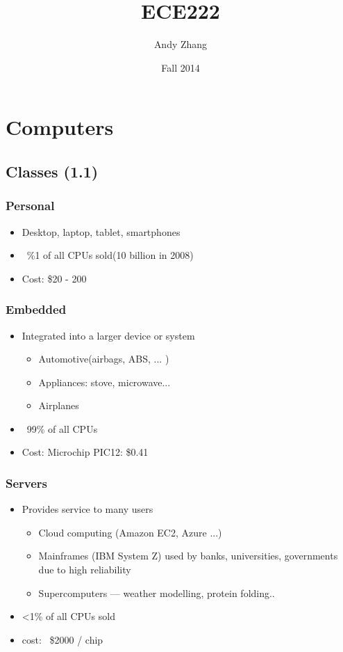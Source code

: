 \documentclass[12pt]{report}
\title{ECE222}
\author{{Andy Zhang}}
\date{{Fall 2014}}
\begin{document}
\maketitle
\tableofcontents
\chapter{Computers}
  \section{Classes (1.1)}

    \subsection{Personal}
      \begin{itemize}
        \item Desktop, laptop, tablet, smartphones
        \item ~\%1 of all CPUs sold(10 billion in 2008)
        \item Cost: \$20 - 200
      \end{itemize}
    \subsection{Embedded}
      \begin{itemize}
        \item Integrated into a larger device or system
        \begin{itemize}
          \item Automotive(airbags, ABS, ... )
          \item Appliances: stove, microwave...
          \item Airplanes
        \end{itemize}
        \item ~99\% of all CPUs
        \item Cost: Microchip PIC12: \$0.41
      \end{itemize}

    \subsection{Servers}
      \begin{itemize}
        \item Provides service to many users
        \begin{itemize}
          \item Cloud computing (Amazon EC2, Azure ...)
          \item Mainframes (IBM System Z) used by banks, universities,
          governments due to high reliability
          \item Supercomputers --- weather modelling, protein folding..
        \end{itemize}
        \item \textless 1\% of all CPUs sold
        \item cost: ~\$2000 / chip
      \end{itemize}
\end{document}
